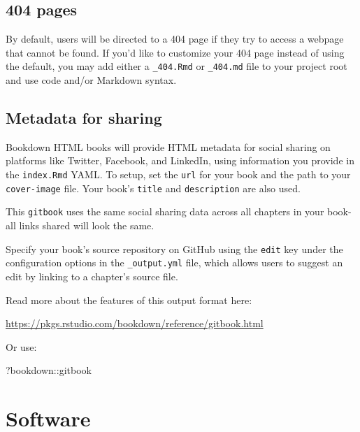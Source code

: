 \documentclass[
]{book}
\newenvironment{Shaded}{\begin{snugshade}}{\end{snugshade}}
\newcommand{\NormalTok}[1]{#1}
\newcommand{\SpecialCharTok}[1]{\textcolor[rgb]{0.00,0.00,0.00}{#1}}
\theoremstyle{definition}
\theoremstyle{definition}
\theoremstyle{definition}
\theoremstyle{definition}
\theoremstyle{remark}
\begin{document}
\hypertarget{pages}{%
\section{404 pages}\label{pages}}

By default, users will be directed to a 404 page if they try to access a webpage that cannot be found. If you'd like to customize your 404 page instead of using the default, you may add either a \texttt{\_404.Rmd} or \texttt{\_404.md} file to your project root and use code and/or Markdown syntax.

\hypertarget{metadata-for-sharing}{%
\section{Metadata for sharing}\label{metadata-for-sharing}}

Bookdown HTML books will provide HTML metadata for social sharing on platforms like Twitter, Facebook, and LinkedIn, using information you provide in the \texttt{index.Rmd} YAML. To setup, set the \texttt{url} for your book and the path to your \texttt{cover-image} file. Your book's \texttt{title} and \texttt{description} are also used.

This \texttt{gitbook} uses the same social sharing data across all chapters in your book- all links shared will look the same.

Specify your book's source repository on GitHub using the \texttt{edit} key under the configuration options in the \texttt{\_output.yml} file, which allows users to suggest an edit by linking to a chapter's source file.

Read more about the features of this output format here:

\url{https://pkgs.rstudio.com/bookdown/reference/gitbook.html}

Or use:

\begin{Shaded}
\begin{Highlighting}[]
\NormalTok{?bookdown}\SpecialCharTok{::}\NormalTok{gitbook}
\end{Highlighting}
\end{Shaded}

\hypertarget{appendix-appendices}{%
\appendix}


\hypertarget{appenA}{%
\chapter{Software}\label{appenA}}
\end{document}
